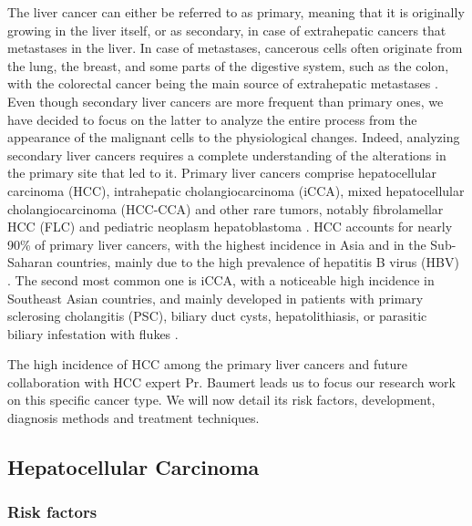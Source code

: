\documentclass[]{article}
\begin{document}
The liver cancer can either be referred to as primary, meaning that it
is originally growing in the liver itself, or as secondary, in case of
extrahepatic cancers that metastases in the liver.
In case of metastases, cancerous cells often originate from the lung,
the breast, and some parts of the digestive system, such as the colon,
with the colorectal cancer being the main source of extrahepatic
metastases \cite{Hoyer2012a, Sahani2014}.
Even though secondary liver cancers are more frequent than primary ones,
we have decided to focus on the latter to analyze the entire process
from the appearance of the malignant cells to the physiological changes.
Indeed, analyzing secondary liver cancers requires a complete
understanding of the alterations in the primary site that led to it.
Primary liver cancers comprise hepatocellular carcinoma (HCC),
intrahepatic cholangiocarcinoma (iCCA), mixed hepatocellular
cholangiocarcinoma (HCC-CCA) and other rare tumors, notably
fibrolamellar HCC (FLC) and pediatric neoplasm hepatoblastoma
\cite{Sia2017, Lozano2012,20113051318}.
HCC accounts for nearly 90\% of primary liver cancers, with the highest
incidence in Asia and in the Sub-Saharan countries, mainly due to the
high prevalence of hepatitis B virus (HBV) \cite{Sia2017, Torre2015}. The second most common one is iCCA, with a
noticeable high incidence in Southeast Asian countries, and mainly
developed in patients with primary sclerosing cholangitis (PSC),
biliary duct cysts, hepatolithiasis, or parasitic biliary infestation
with flukes \cite{Sia2017, Bridgewater2014}.

The high incidence of HCC among the primary liver cancers and future collaboration with HCC expert Pr. Baumert leads us to focus our research work on
this specific cancer type. We will now detail its risk factors,
development, diagnosis methods and treatment techniques.

\subsection*{Hepatocellular Carcinoma}\label{hepatocellular-carcinoma}

\subsubsection*{Risk factors}\label{risk-factors}
\end{document}
